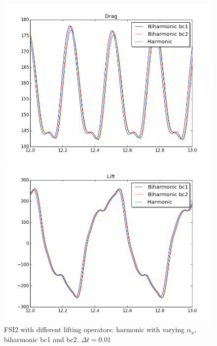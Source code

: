 \begin{figure}[H]
\begin{minipage}[b]{0.6\linewidth}
    \vspace{4ex}
  \end{minipage} 
  \begin{minipage}[b]{0.6\linewidth}
    \centering
    \includegraphics[scale=0.40]{./Mesh_motion_results/FSI2_dt001_drag.png} 
    \vspace{4ex}
  \end{minipage}%
  \begin{minipage}[b]{0.6\linewidth}
    \centering
    \includegraphics[scale=0.40]{./Mesh_motion_results/FSI2_dt001_lift.png} 
    \vspace{4ex}
  \end{minipage} 
\caption {FSI2 with different lifting operators: harmonic with varying $\alpha_u$, biharmonic bc1 and bc2. $\Delta t = 0.01$}
\label{fig:FSI2_motion-1} 
\end{figure}

